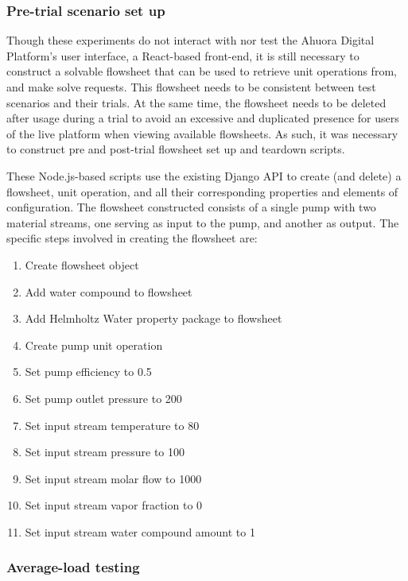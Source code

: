 \subsubsection{Pre-trial scenario set up}

Though these experiments do not interact with nor test the Ahuora Digital Platform's user interface, a React-based front-end, it is still necessary to construct a solvable flowsheet that can be used to retrieve unit operations from, and make solve requests. This flowsheet needs to be consistent between test scenarios and their trials. At the same time, the flowsheet needs to be deleted after usage during a trial to avoid an excessive and duplicated presence for users of the live platform when viewing available flowsheets. As such, it was necessary to construct pre and post-trial flowsheet set up and teardown scripts.

These Node.js-based scripts use the existing Django API to create (and delete) a flowsheet, unit operation, and all their corresponding properties and elements of configuration. The flowsheet constructed consists of a single pump with two material streams, one serving as input to the pump, and another as output. The specific steps involved in creating the flowsheet are:

\begin{enumerate}[itemsep=0pt]
    \item Create flowsheet object
    \item Add water compound to flowsheet
    \item Add Helmholtz Water property package to flowsheet
    \item Create pump unit operation
    \item Set pump efficiency to 0.5
    \item Set pump outlet pressure to 200
    \item Set input stream temperature to 80
    \item Set input stream pressure to 100
    \item Set input stream molar flow to 1000
    \item Set input stream vapor fraction to 0
    \item Set input stream water compound amount to 1
\end{enumerate}

\subsubsection{Average-load testing}

